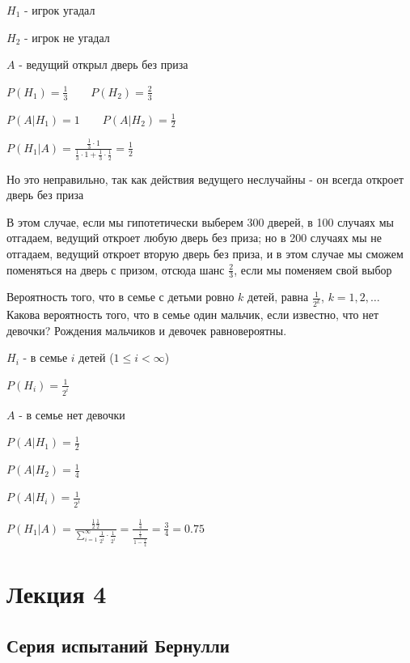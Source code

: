 \documentclass[12pt]{article}
\begin{document}
    $H_1$ - игрок угадал

    $H_2$ - игрок не угадал

    $A$ - ведущий открыл дверь без приза

    $P(H_1) = \frac{1}{3} \quad\quad P(H_2) = \frac{2}{3}$

    $P(A|H_1) = 1 \quad\quad P(A|H_2) = \frac{1}{2}$

    $P(H_1|A) = \frac{\frac{1}{3} \cdot 1}{\frac{1}{3} \cdot 1 + \frac{1}{3} \cdot \frac{1}{2}} = \frac{1}{2}$

    Но это неправильно, так как действия ведущего неслучайны - он всегда откроет дверь без приза

    В этом случае, если мы гипотетически выберем 300 дверей, в 100 случаях мы отгадаем, ведущий откроет любую дверь без приза;
    но в 200 случаях мы не отгадаем, ведущий откроет вторую дверь без приза, и в этом случае мы сможем поменяться на дверь с призом,
    отсюда шанс $\frac{2}{3}$, если мы поменяем свой выбор \hfill


     Вероятность того, что в семье с детьми ровно $k$ детей, равна $\frac{1}{2^k}$, $k = 1, 2, \dots$
    Какова вероятность того, что в семье один мальчик, если известно, что нет
    девочки? Рождения мальчиков и девочек равновероятны.


    $H_i$ - в семье $i$ детей ($1 \leq i < \infty$)

    $P(H_i) = \frac{1}{2^i}$

    $A$ - в семье нет девочки

    $P(A|H_1) = \frac{1}{2}$

    $P(A|H_2) = \frac{1}{4}$

    $P(A|H_i) = \frac{1}{2^i}$

    $P(H_1 | A) = \frac{\frac{1}{2} \frac{1}{2}}{\sum_{i = 1}^\infty \frac{1}{2^i} \cdot \frac{1}{2^i}} = \frac{\frac{1}{4}}{\frac{\frac{1}{4}}{1 - \frac{1}{4}}} = \frac{3}{4} = 0.75$


    \section{Лекция 4}

    \subsection{Серия испытаний Бернулли}
\end{document}
